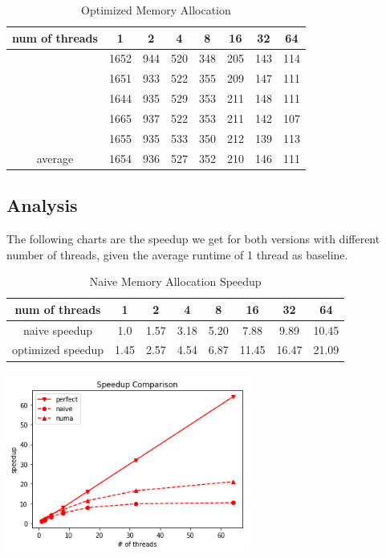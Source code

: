 \documentclass{cs4444}
\begin{document}
\begin{table}[ht]
\caption {Optimized Memory Allocation}
\centering
\begin{tabular}{c c c c c c c c}
\hline\hline
num of threads & 1 & 2 & 4 & 8 & 16 & 32 & 64 \\
\hline
 & 1652 & 944 & 520 & 348 & 205 & 143 & 114 \\
 & 1651 & 933 & 522 & 355 & 209 & 147 & 111 \\
 & 1644 & 935 & 529 & 353 & 211 & 148 & 111 \\
 & 1665 & 937 & 522 & 353 & 211 & 142 & 107 \\
 & 1655 & 935 & 533 & 350 & 212 & 139 & 113 \\
\hline
average & 1654 & 936 & 527 & 352 & 210 & 146 & 111\\
\end{tabular}
\centering
\end{table}

\subsection{Analysis}

The following charts are the speedup we get for both versions with different number of threads, given the average runtime of 1 thread as baseline.

\begin{table}[ht]
\caption {Naive Memory Allocation Speedup}
\centering
\begin{tabular}{c c c c c c c c}
\hline\hline
num of threads & 1 & 2 & 4 & 8 & 16 & 32 & 64 \\
\hline
naive speedup & 1.0 & 1.57 & 3.18 & 5.20 & 7.88 & 9.89 & 10.45\\
optimized speedup & 1.45 & 2.57 & 4.54 & 6.87 & 11.45 & 16.47 & 21.09 \\ 
\end{tabular}
\centering
\end{table}

\begin{center}
\includegraphics[width=8cm, height=6cm]{speedup}
\end{center}
\end{document}
